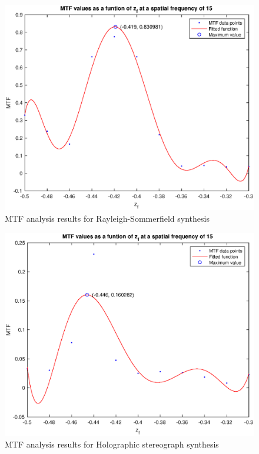 \documentclass[12pt,a4paper,english
]{tunithesis}
\begin{document}
\begin{figure}
  \centering
  \includegraphics[width=\columnwidth]{img/mtf_rs.eps}
  \caption{MTF analysis results for Rayleigh-Sommerfield synthesis}
  \label{fig:mtf_rs}
\end{figure}

\begin{figure}
  \centering
  \includegraphics[width=\columnwidth]{img/mtf_hs.eps}
  \caption{MTF analysis results for Holographic stereograph synthesis}
  \label{fig:mtf_hs}
\end{figure}
\end{document}

